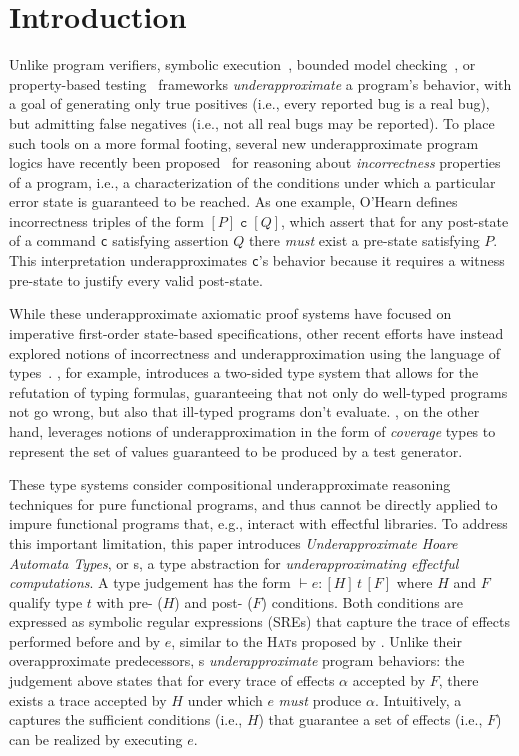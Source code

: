 \section{Introduction}
\label{sec:intro}

Unlike program verifiers, symbolic execution~\cite{CD11,DFLO19},
bounded model checking~\cite{CKL04,DGJ+13,DQ17}, or property-based
testing~\cite{CH00,Quickstrom,BeginnerLuck,HC+24} frameworks
\emph{underapproximate} a program's behavior, with a goal of
generating only true positives (i.e., every reported bug is a real
bug), but admitting false negatives (i.e., not all real bugs may be
reported). To place such tools on a more formal footing, several new
underapproximate program logics have recently been
proposed~\cite{casl,OHP19,LR+22,ZDS23} for reasoning about
\emph{incorrectness} properties of a program, i.e., a characterization
of the conditions under which a particular error state is guaranteed
to be reached.  As one example, O'Hearn defines~\cite{OHP19}
incorrectness triples of the form $[P]\;\texttt{c}\;[Q]$, which assert
that for any post-state of a command \texttt{c} satisfying assertion
$Q$ there \emph{must} exist a pre-state satisfying $P$.  This
interpretation underapproximates \texttt{c}'s behavior because it
requires a witness pre-state to justify every valid post-state.

While these underapproximate axiomatic proof systems have focused on
imperative first-order state-based specifications, other recent
efforts have instead explored notions of incorrectness and
underapproximation using the language of
types~\cite{RW24,WGJ24,CoverageType}. \citet{RW24}, for example, introduces
a two-sided type system that allows for the refutation of typing
formulas, guaranteeing that not only do well-typed programs not go
wrong, but also that ill-typed programs don't
evaluate. \citet{CoverageType}, on the other hand, leverages notions of
underapproximation in the form of \emph{coverage} types to represent
the set of values guaranteed to be produced by a test generator.

These type systems consider compositional underapproximate reasoning
techniques for pure functional programs, and thus cannot be directly
applied to impure functional programs that, e.g., interact with
effectful libraries.  To address this important limitation, this paper
introduces \emph{Underapproximate Hoare Automata Types}, or
\tyName{}s, a type abstraction for \emph{underapproximating effectful
  computations}.  A \tyName{} type judgement has the form $\vdash e : [H]\,t\,[F]$ where $H$ and $F$ qualify type $t$ with pre- ($H$) and post-
($F$) conditions. Both conditions are expressed as symbolic regular
expressions (SREs) that capture the trace of effects performed before
and by $e$, similar to the \textsc{Hat}s proposed by
\citet{ZYDJ24}. Unlike their overapproximate predecessors,
\tyName{}s \emph{underapproximate} program behaviors: the judgement
above states that for every trace of effects $\alpha$ accepted by $F$,
there exists a trace accepted by $H$ under which $e$ \emph{must}
produce $\alpha$.  Intuitively, a \tyName{} captures the sufficient
conditions (i.e., $H$) that guarantee a set of effects (i.e., $F$) can
be realized by executing $e$.

